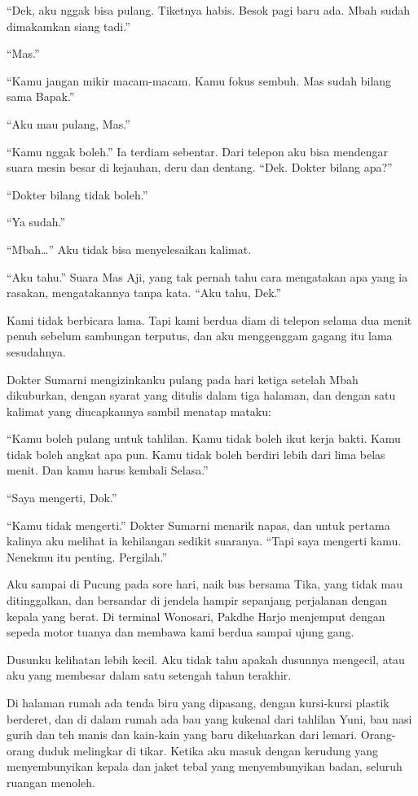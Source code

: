 \documentclass[11pt,twoside,openany]{book}
\makeatletter
\newcommand{\scenebreak}{\par\vspace{0.9em}{\centering\textsc{*\hspace{0.7em}*\hspace{0.7em}*}\par}\vspace{0.9em}\@afterindentfalse\@afterheading}
\makeatother
\begin{document}
``Dek, aku nggak bisa pulang. Tiketnya habis. Besok pagi baru ada. Mbah sudah dimakamkan siang tadi.''

``Mas.''

``Kamu jangan mikir macam-macam. Kamu fokus sembuh. Mas sudah bilang sama Bapak.''

``Aku mau pulang, Mas.''

``Kamu nggak boleh.'' Ia terdiam sebentar. Dari telepon aku bisa mendengar suara mesin besar di kejauhan, deru dan dentang. ``Dek. Dokter bilang apa?''

``Dokter bilang tidak boleh.''

``Ya sudah.''

``Mbah\ldots{}'' Aku tidak bisa menyelesaikan kalimat.

``Aku tahu.'' Suara Mas Aji, yang tak pernah tahu cara mengatakan apa yang ia rasakan, mengatakannya tanpa kata. ``Aku tahu, Dek.''

Kami tidak berbicara lama. Tapi kami berdua diam di telepon selama dua menit penuh sebelum sambungan terputus, dan aku menggenggam gagang itu lama sesudahnya.

\scenebreak
Dokter Sumarni mengizinkanku pulang pada hari ketiga setelah Mbah dikuburkan, dengan syarat yang ditulis dalam tiga halaman, dan dengan satu kalimat yang diucapkannya sambil menatap mataku:

``Kamu boleh pulang untuk tahlilan. Kamu tidak boleh ikut kerja bakti. Kamu tidak boleh angkat apa pun. Kamu tidak boleh berdiri lebih dari lima belas menit. Dan kamu harus kembali Selasa.''

``Saya mengerti, Dok.''

``Kamu tidak mengerti.'' Dokter Sumarni menarik napas, dan untuk pertama kalinya aku melihat ia kehilangan sedikit suaranya. ``Tapi saya mengerti kamu. Nenekmu itu penting. Pergilah.''

Aku sampai di Pucung pada sore hari, naik bus bersama Tika, yang tidak mau ditinggalkan, dan bersandar di jendela hampir sepanjang perjalanan dengan kepala yang berat. Di terminal Wonosari, Pakdhe Harjo menjemput dengan sepeda motor tuanya dan membawa kami berdua sampai ujung gang.

Dusunku kelihatan lebih kecil. Aku tidak tahu apakah dusunnya mengecil, atau aku yang membesar dalam satu setengah tahun terakhir.

Di halaman rumah ada tenda biru yang dipasang, dengan kursi-kursi plastik berderet, dan di dalam rumah ada bau yang kukenal dari tahlilan Yuni, bau nasi gurih dan teh manis dan kain-kain yang baru dikeluarkan dari lemari. Orang-orang duduk melingkar di tikar. Ketika aku masuk dengan kerudung yang menyembunyikan kepala dan jaket tebal yang menyembunyikan badan, seluruh ruangan menoleh.
\end{document}
